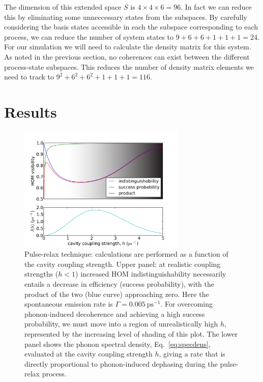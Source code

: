The dimension of this extended space $S$ is $4 \times 4 \times 6 = 96$. In fact we can reduce this by eliminating some unneccessary states from the subspaces. By carefully considering the basis states accessible in each the subspace corresponding to each process, we can reduce the number of system states to $9 + 6 + 6 + 1 + 1 + 1 = 24$. For our simulation we will need to calculate the density matrix for this system. As noted in the previous section, no coherences can exist between the different process-state subspaces. This reduces the number of density matrix elements we need to track to $9^2 + 6^2 + 6^2 + 1 + 1 + 1 = 116$.

\section{Results}

\begin{figure}[htb]
  \begin{center}
  \includegraphics[width=8cm]{assets/2LS_plot.pdf}
  \end{center}
  \caption{Pulse-relax technique: calculations are performed as a function of the cavity coupling strength. Upper panel: at realistic coupling strengths ($h<1$) increased HOM indistinguishability necessarily entails a decrease in efficiency (success probability), with the product of the two (blue curve) approaching zero. Here the spontaneous emission rate is $\Gamma = 0.005~\mathrm{ps}^{-1}$. For overcoming phonon-induced decoherence and achieving a  high success probability, we must move into a region of unrealistically high $h$, represented by the increasing level of shading of this plot.
 The lower panel shows the phonon spectral density, Eq.~\ref{eq:specdens}, evaluated at the cavity coupling strength $h$, giving a rate that is directly proportional to phonon-induced dephasing during the pulse-relax process.
 }
  \label{2LS_plot}
\end{figure}

